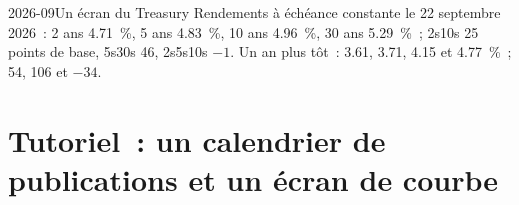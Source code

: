 \begin{dated}{2026-09}{Un écran du Treasury}\label{dat:m2:reading-a-macro-calendar-and-a-rates-screen:screen}
Rendements à échéance constante le 22 septembre 2026~: 2 ans 4.71~\%, 5 ans 4.83~\%, 10 ans 4.96~\%,
30 ans 5.29~\%~; 2s10s 25 points de base, 5s30s 46,  2s5s10s $-1$. Un an plus tôt~: 3.61, 3.71,
4.15 et 4.77~\%~; 54, 106 et $-34$.
\end{dated}

\section{Tutoriel~: un calendrier de publications et un écran de courbe}\label{tut:m2:reading-a-macro-calendar-and-a-rates-screen:macrocal}


